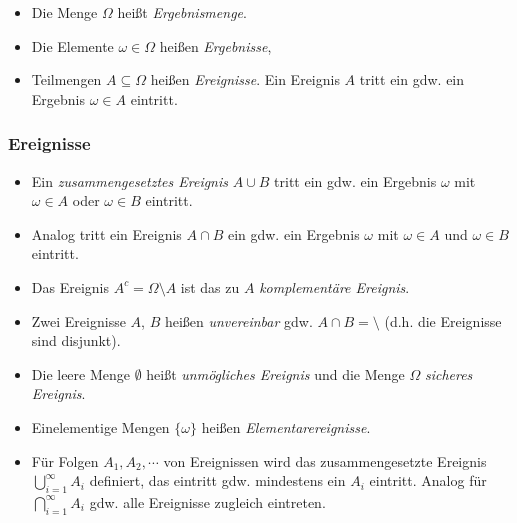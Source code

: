             \begin{itemize}
            	\item Die Menge \(\Omega\) heißt \textit{Ergebnismenge}.
            	\item Die Elemente \(\omega \in \Omega\) heißen \textit{Ergebnisse},
            	\item Teilmengen \(A \subseteq \Omega\) heißen \textit{Ereignisse}. Ein Ereignis \(A\) tritt ein gdw. ein Ergebnis \( \omega \in A \) eintritt.
            \end{itemize}

            \subsubsection{Ereignisse}
                \begin{itemize}
                	\item Ein \textit{zusammengesetztes Ereignis} \( A \cup B \) tritt ein gdw. ein Ergebnis \(\omega\) mit \(\omega \in A\) oder \(\omega \in B\) eintritt.
                	\item Analog tritt ein Ereignis \( A \cap B \) ein gdw. ein Ergebnis \(\omega\) mit \(\omega \in A\) und \(\omega \in B\) eintritt.
                	\item Das Ereignis \( A ^ c = \Omega \setminus A \) ist das zu \(A\) \textit{komplementäre Ereignis}.
                	\item Zwei Ereignisse \(A\), \(B\) heißen \textit{unvereinbar} gdw. \( A \cap B = \setminus \) (d.h. die Ereignisse sind disjunkt).
                	\item Die leere Menge \(\emptyset\) heißt \textit{unmögliches Ereignis} und die Menge \(\Omega\) \textit{sicheres Ereignis}.
                	\item Einelementige Mengen \( \{ \omega \} \) heißen \textit{Elementarereignisse}.
                	\item Für Folgen \( A_1, A_2, \cdots \) von Ereignissen wird das zusammengesetzte Ereignis \( \bigcup_{i = 1}^\infty A_i \) definiert, das eintritt gdw. mindestens ein \(A_i\) eintritt. Analog für \( \bigcap_{i = 1}^\infty A_i \) gdw. alle Ereignisse zugleich eintreten.
                \end{itemize}

